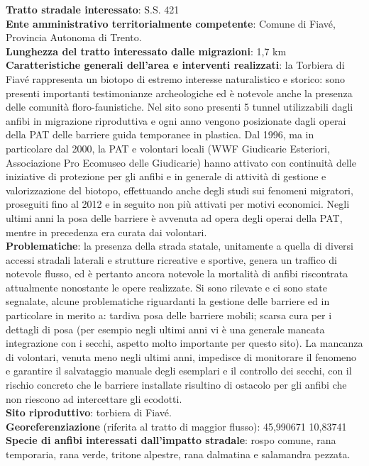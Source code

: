 \documentclass[11pt,a4paper,twoside]{memoir}
\begin{document}
\textbf{Tratto stradale interessato}: S.S. 421  \\
\textbf{Ente amministrativo territorialmente competente}: Comune di Fiavé, Provincia Autonoma di Trento.  \\
\textbf{Lunghezza del tratto interessato dalle migrazioni}: 1,7 km \\
\textbf{Caratteristiche generali dell’area e interventi realizzati}: la Torbiera di Fiavé rappresenta un biotopo di estremo interesse naturalistico e storico: sono presenti importanti testimonianze archeologiche ed è notevole anche la presenza delle comunità floro-faunistiche. Nel sito sono presenti 5 tunnel utilizzabili dagli anfibi in migrazione riproduttiva e ogni anno vengono posizionate dagli operai della PAT delle barriere guida temporanee in plastica. Dal 1996, ma in particolare dal 2000, la PAT e volontari locali (WWF Giudicarie Esteriori, Associazione Pro Ecomuseo delle Giudicarie) hanno attivato con continuità delle iniziative di protezione per gli anfibi e in generale di attività di gestione e valorizzazione del biotopo, effettuando anche degli studi sui fenomeni migratori, proseguiti fino al 2012 e in seguito non più attivati per motivi economici. Negli ultimi anni la posa delle barriere è avvenuta ad opera degli operai della PAT, mentre in precedenza era curata dai volontari. \\
\textbf{Problematiche}: la presenza della strada statale, unitamente a quella di diversi accessi stradali laterali e strutture ricreative e sportive, genera un traffico di notevole flusso, ed è pertanto  ancora notevole la mortalità di anfibi riscontrata attualmente nonostante le opere realizzate. Si sono rilevate e ci sono state segnalate, alcune problematiche riguardanti la gestione delle barriere ed in particolare in merito a: tardiva posa delle barriere mobili; scarsa cura per i dettagli di posa (per esempio negli ultimi anni vi è una generale mancata integrazione con i secchi, aspetto molto importante per questo sito). La mancanza di volontari, venuta meno negli ultimi anni, impedisce di monitorare il fenomeno e garantire il salvataggio manuale degli esemplari e il controllo dei secchi, con il rischio concreto che le barriere installate risultino di ostacolo per gli anfibi che non riescono ad intercettare gli ecodotti. \\
\textbf{Sito riproduttivo}: torbiera di Fiavé. \\
\textbf{Georeferenziazione} (riferita al tratto di maggior flusso): 45,990671 10,83741  \\
\textbf{Specie di anfibi interessati dall’impatto stradale}: rospo comune, rana temporaria, rana verde, tritone alpestre, rana dalmatina e salamandra pezzata. \\
\end{document}
